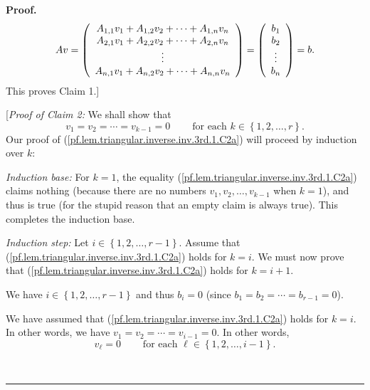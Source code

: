 \documentclass[numbers=enddot,12pt,final,onecolumn,notitlepage]{scrartcl}%
\theoremstyle{definition}
\newenvironment{proof}[1][Proof]{\noindent\textbf{#1.} }{\ \rule{0.5em}{0.5em}}
\begin{document}
\begin{proof}
\[
Av=\left(
\begin{array}
[c]{c}%
A_{1,1}v_{1}+A_{1,2}v_{2}+\cdots+A_{1,n}v_{n}\\
A_{2,1}v_{1}+A_{2,2}v_{2}+\cdots+A_{2,n}v_{n}\\
\vdots\\
A_{n,1}v_{1}+A_{n,2}v_{2}+\cdots+A_{n,n}v_{n}%
\end{array}
\right)  =\left(
\begin{array}
[c]{c}%
b_{1}\\
b_{2}\\
\vdots\\
b_{n}%
\end{array}
\right)  =b.
\]
This proves Claim 1.]

[\textit{Proof of Claim 2:} We shall show that%
\begin{equation}
v_{1}=v_{2}=\cdots=v_{k-1}=0\ \ \ \ \ \ \ \ \ \ \text{for each }k\in\left\{
1,2,\ldots,r\right\}  \text{.} \label{pf.lem.triangular.inverse.inv.3rd.1.C2a}%
\end{equation}
Our proof of (\ref{pf.lem.triangular.inverse.inv.3rd.1.C2a}) will proceed by
induction over $k$:

\textit{Induction base:} For $k=1$, the equality
(\ref{pf.lem.triangular.inverse.inv.3rd.1.C2a}) claims nothing (because there
are no numbers $v_{1},v_{2},\ldots,v_{k-1}$ when $k=1$), and thus is true (for
the stupid reason that an empty claim is always true). This completes the
induction base.

\textit{Induction step:} Let $i\in\left\{  1,2,\ldots,r-1\right\}  $. Assume
that (\ref{pf.lem.triangular.inverse.inv.3rd.1.C2a}) holds for $k=i$. We must
now prove that (\ref{pf.lem.triangular.inverse.inv.3rd.1.C2a}) holds for
$k=i+1$.

We have $i\in\left\{  1,2,\ldots,r-1\right\}  $ and thus $b_{i}=0$ (since
$b_{1}=b_{2}=\cdots=b_{r-1}=0$).

We have assumed that (\ref{pf.lem.triangular.inverse.inv.3rd.1.C2a}) holds for
$k=i$. In other words, we have $v_{1}=v_{2}=\cdots=v_{i-1}=0$. In other words,%
\begin{equation}
v_{\ell}=0\ \ \ \ \ \ \ \ \ \ \text{for each }\ell\in\left\{  1,2,\ldots
,i-1\right\}  . \label{pf.lem.triangular.inverse.inv.3rd.1.C2a.pf.1}%
\end{equation}



\end{proof}
\end{document}
